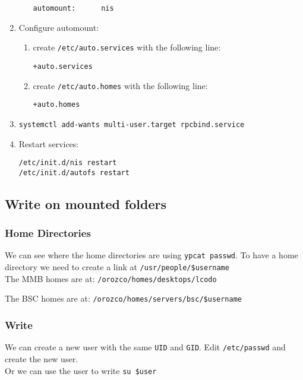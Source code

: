\documentclass[a4paper,10pt]{article}
\begin{document}
\begin{enumerate}
\begin{enumerate}
\begin{verbatim}
automount:      nis
\end{verbatim}
\end{enumerate}

\item Configure automount:
\begin{enumerate}
 \item create \texttt{/etc/auto.services} with the following line:
\begin{verbatim}
+auto.services
\end{verbatim}
\item create \texttt{/etc/auto.homes} with the following line:
\begin{verbatim}
+auto.homes
\end{verbatim}
\end{enumerate}

\item \texttt{systemctl add-wants multi-user.target rpcbind.service}

\item Restart services:
\begin{verbatim}
/etc/init.d/nis restart
/etc/init.d/autofs restart
\end{verbatim}

\end{enumerate}

\subsection{Write on mounted folders}
\subsubsection{Home Directories}
We can see where the home directories are using \texttt{ypcat passwd}. To have a home directory we need to create a link at \texttt{/usr/people/\$username} \\

The MMB homes are at:
\texttt{/orozco/homes/desktops/lcodo}

The BSC homes are at:
\texttt{/orozco/homes/servers/bsc/\$username}

\subsubsection{Write}
We can create a new user with the same \texttt{UID} and \texttt{GID}. Edit \texttt{/etc/passwd} and create the new user.\\

Or we can use the user to write \texttt{su \$user}
\end{document}
